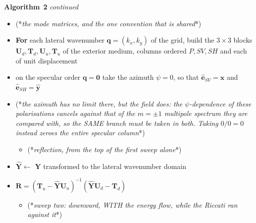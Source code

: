 \documentclass[11pt,a4paper]{article}
\newcommand{\bU}{\mathbf{U}}
\newcommand{\bR}{\mathbf{R}}
\newcommand{\bY}{\mathbf{Y}}
\begin{document}
\vspace{4mm}
\noindent\begin{minipage}{\linewidth}
\textbf{Algorithm}~\textbf{2} {\em continued\/}\newline
\vspace{2mm}

\begin{itemize}
\item (*{\em the mode matrices, and the one convention that is shared\/}*)

\item \textbf{For} each lateral wavenumber $\mathbf{q}=(k_x,k_y)$ of the grid,
build the $3\times3$ blocks $\bU_d,\mathbf{T}_d,\bU_u,\mathbf{T}_u$ of the
exterior medium, columns ordered $P,SV,SH$ and each of unit displacement
\item on the specular order $\mathbf{q}=\mathbf{0}$ take the azimuth
      $\psi=0$, so that $\hat{\mathbf{e}}_{SV}=\hat{\mathbf{x}}$ and
      $\hat{\mathbf{e}}_{SH}=\hat{\mathbf{y}}$
\item (*{\em the azimuth has no limit there, but the field does: the
      $\psi$-dependence of these polarisations cancels against that of the
      $m=\pm1$ multipole spectrum they are compared with, so the SAME branch
      must be taken in both.  Taking $0/0=0$ instead zeroes the entire specular
      column\/}*)

\begin{itemize}
\item (*{\em reflection, from the top of the first sweep alone\/}*)
\end{itemize}

\item $\hat{\bY}\leftarrow$ $\bY$ transformed to the lateral wavenumber domain
\item $\bR = \left(\mathbf{T}_u-\hat{\bY}\bU_u\right)^{-1}
             \left(\hat{\bY}\bU_d-\mathbf{T}_d\right)$

\begin{itemize}
\item (*{\em sweep two: downward, WITH the energy flow, while the Riccati ran
against it\/}*)
\end{itemize}


\end{itemize}
\end{minipage}
\end{document}
